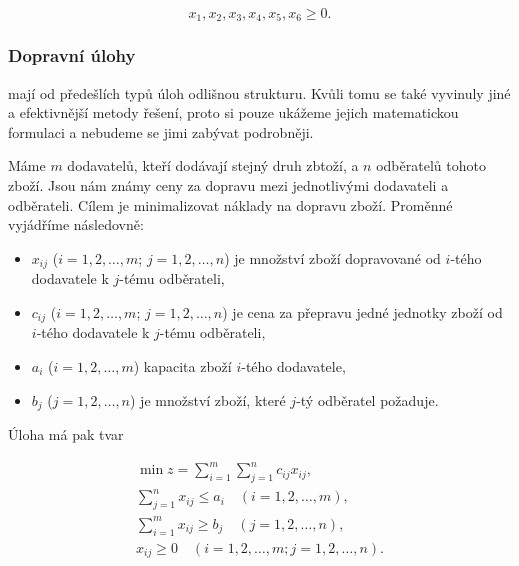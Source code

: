 \begin{equation*}
    x_1, x_2, x_3, x_4, x_5, x_6 \geq 0.
\end{equation*}


\subsubsection{Dopravní úlohy} mají od předešlích typů úloh odlišnou strukturu.
Kvůli tomu se také vyvinuly jiné a efektivnější metody řešení, proto si pouze ukážeme jejich matematickou formulaci a nebudeme se jimi zabývat podrobněji.

Máme $m$ dodavatelů, kteří dodávají stejný druh zbtoží, a $n$ odběratelů tohoto zboží.
Jsou nám známy ceny za dopravu mezi jednotlivými dodavateli a odběrateli.
Cílem je minimalizovat náklady na dopravu zboží. Proměnné vyjádříme následovně:

\begin{itemize}[label={}]
    \item $x_{ij}$ ($i = 1, 2, \ldots, m$; $j = 1, 2, \ldots, n$) je množství zboží dopravované od $i$-tého dodavatele k $j$-tému odběrateli,
    \item $c_{ij}$ ($i = 1, 2, \ldots, m$; $j = 1, 2, \ldots, n$) je cena za přepravu jedné jednotky zboží od $i$-tého dodavatele k $j$-tému odběrateli,
    \item $a_i$ ($i = 1, 2, \ldots, m$) kapacita zboží $i$-tého dodavatele,
    \item $b_j$ ($j = 1, 2, \ldots, n$) je množství zboží, které $j$-tý odběratel požaduje.
\end{itemize}

Úloha má pak tvar

\begin{equation}
    \begin{gathered}
        \min z = \sum_{i=1}^{m} \sum_{j=1}^{n} c_{ij}x_{ij}, \\
        \sum_{j=1}^{n} x_{ij} \leq a_i \quad (i = 1, 2, \ldots, m), \\
        \sum_{i=1}^{m} x_{ij} \geq b_j \quad (j = 1, 2, \ldots, n), \\
        x_{ij} \geq 0 \quad (i = 1, 2, \ldots, m; j = 1, 2, \ldots, n).
    \end{gathered}
\end{equation}

